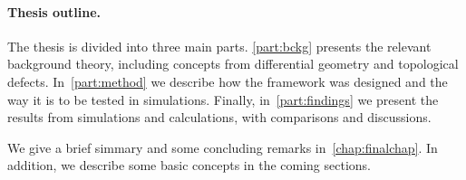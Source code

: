









\paragraph{Thesis outline.} %
{%
The thesis is divided into three main parts. %
\cref{part:bckg} presents the relevant background theory, including concepts from differential geometry and topological defects. %
In~\cref{part:method} we describe how the framework was designed and the way it is to be tested in simulations. %
Finally, in~\cref{part:findings} we present the results from simulations and calculations, with comparisons and discussions. %

We give a brief simmary and some concluding remarks in~\cref{chap:finalchap}. In addition, we describe some basic concepts in the coming sections. 
}










